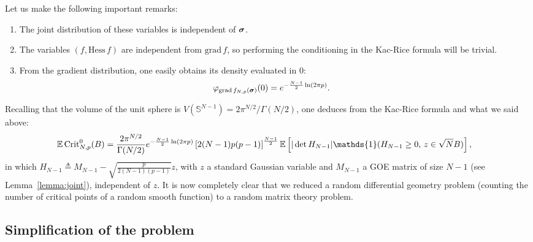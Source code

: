 \documentclass[amsmath,amssymb,nofootinbib,prd]{article}
\begin{document}
	Let us make the following important remarks:
	\begin{enumerate}
	\item The joint distribution of these variables is independent of ${\boldsymbol{\sigma}}$.
	\item The variables $(f,\mathrm{Hess}\, f)$ are independent from $\mathrm{grad}\,f$, so performing the conditioning in the Kac-Rice formula will be trivial.
	\item From the gradient distribution, one easily obtains its density evaluated in $0$:
	\begin{align*}
	 \varphi_{\mathrm{grad}\, f_{N,p}({\boldsymbol{\sigma}})}(0) &= e^{- \frac{N-1}{2} \ln (2 \pi p)}.
	\end{align*}
	\end{enumerate}
	Recalling that the volume of the unit sphere is $V(\mathbb{S}^{N-1}) = 2 \pi^{N/2} / \Gamma(N/2)$, one deduces from the Kac-Rice formula and what we said above:
	\begin{align}\label{eq:0}
	\EE \, \mathrm{Crit}_{N,p}^0(B) &= \frac{2 \pi^{N/2}}{\Gamma(N/2)}e^{- \frac{N-1}{2} \ln (2 \pi p)} \left[2 (N-1)p(p-1)\right]^{\frac{N-1}{2}} \EE \left[|\det H_{N-1}| \mathds{1}(H_{N-1} \geq 0, \, z \in \sqrt{N} B)\right],
	\end{align}
	in which $H_{N-1} \triangleq M_{N-1} - \sqrt{\frac{p}{2 (N-1)(p-1)}} z$, with $z$ a standard Gaussian variable and $M_{N-1}$ a GOE matrix of size $N-1$ (see Lemma~\ref{lemma:joint}), independent of $z$. 
	It is now completely clear that we reduced a random differential geometry problem (counting the number of critical points of a random smooth function) to a random matrix theory problem. 
	
	\subsection{Simplification of the problem}
	
\end{document}
